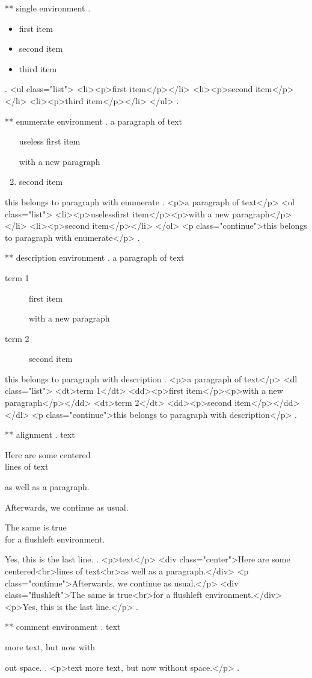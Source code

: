 ** single environment
.
\begin{itemize}
    \item first item
    \item second item
    \item third item
\end{itemize}
.
<ul class="list">
<li><p>ﬁrst item</p></li>
<li><p>second item</p></li>
<li><p>third item</p></li>
</ul>
.



** enumerate environment
.
a paragraph of text

\begin{enumerate}
    \item[useless] first item

        with a new paragraph
    \item second item
\end{enumerate}
this belongs to paragraph with enumerate
.
<p>a paragraph of text</p>
<ol class="list">
<li><p>uselessﬁrst item</p><p>with a new paragraph</p></li>
<li><p>second item</p></li>
</ol>
<p class="continue">this belongs to paragraph with enumerate</p>
.


** description environment
.
a paragraph of text

\begin{description}
    \item[term 1] first item

        with a new paragraph
    \item[term 2] second item
\end{description}
this belongs to paragraph with description
.
<p>a paragraph of text</p>
<dl class="list">
<dt>term 1</dt>
<dd><p>ﬁrst item</p><p>with a new paragraph</p></dd>
<dt>term 2</dt>
<dd><p>second item</p></dd>
</dl>
<p class="continue">this belongs to paragraph with description</p>
.


** alignment
.
text
\begin{center}
    Here are some centered\\
    lines of text

    as well as a paragraph.
\end{center}
Afterwards, we continue as usual.
\begin{flushleft}
    The same is true\\
    for a flushleft environment.
\end{flushleft}

Yes, this is the last line.
.
<p>text</p>
<div class="center">Here are some centered<br>lines of text<br>as well as a paragraph.</div>
<p class="continue">Afterwards, we continue as usual.</p>
<div class="flushleft">The same is true<br>for a ﬂushleft environment.</div>
<p>Yes, this is the last line.</p>
.



** comment environment
.
text
\begin{comment}
    This is a comment.
    \end{comment
    still more comment.
\end{comment}
more text, but now with%
\begin{comment}
    This is a comment.
\end{comment}
out space.
.
<p>text more text, but now without space.</p>
.